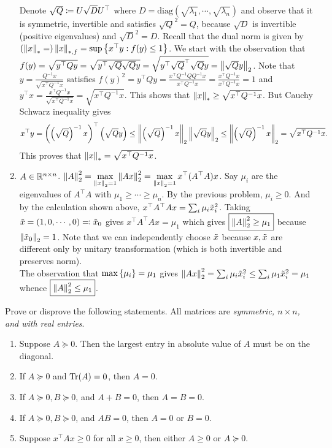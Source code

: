 \begin{enumerate}[leftmargin=*]
Denote $\sqrt{Q}\coloneqq U \sqrt D U^\top$ where $D=\text{diag}(\sqrt{\lambda_1},\cdots,\sqrt{\lambda_n})$ and observe that it is symmetric, invertible and satisfies $\sqrt Q^2 = Q$, because $\sqrt{D}$ is invertible (positive eigenvalues) and $\sqrt D^2=D$.
Recall that the dual norm is given by $\left(\left\lVert x \right\rVert_{*}=\right)\left\lVert x \right\rVert_{*,f} = \sup\left\{x^\top y : f(y)\leq 1\right\}$. We start with the observation that $f(y) = \sqrt{y^\top Q y} = \sqrt{y^\top \sqrt Q \sqrt Q y} = \sqrt{y^\top \sqrt Q^\top \sqrt Q y} = \left\lVert \sqrt Qy \right\rVert_{2}$. 
Note that $y=\frac{Q^{-1}x}{\sqrt{x^\top Q^{-1}x}}$ satisfies $f(y)^2 = y^\top Q y = \frac{x^\top Q^{-1} Q Q^{-1}x}{x^\top Q^{-1}x} = \frac{x^\top Q^{-1}x}{x^\top Q^{-1}x} = 1$ and $y^\top x= \frac{x^\top Q^{-1}x}{\sqrt{x^\top Q^{-1}x}} = \sqrt{x^\top Q^{-1}x}$. This shows that $\left\lVert x \right\rVert_{*} \geq \sqrt{x^\top Q^{-1}x}$. But Cauchy Schwarz inequality gives 
$$x^\top y = \left(\left(\sqrt Q\right)^{-1} x\right)^\top\left(\sqrt Qy\right)\leq \left\lVert \left(\sqrt Q\right)^{-1}x \right\rVert_{2}\left\lVert \sqrt Qy \right\rVert_{2} \leq \left\lVert \left(\sqrt Q\right)^{-1}x \right\rVert_{2}=\sqrt{x^\top Q^{-1}x}.$$ This proves that $\left\lVert x \right\rVert_{*} = \sqrt{x^\top Q^{-1}x}$.

\item $A\in\mathbb{R}^{n\times n}$. $\displaystyle\left\lVert A \right\rVert_{2} ^2 = \max_{\left\lVert x \right\rVert_{2} = 1}\left\lVert Ax \right\rVert_{2}^2 = \max_{\left\lVert x \right\rVert_{2} = 1} x^\top (A^\top A)x$. Say $\mu_i$ are the eigenvalues of $A^\top A$ with $\mu_1\geq\cdots\geq \mu_n$. By the previous problem, $\mu_i\geq 0$. And by the calculation shown above, $x^\top A^\top Ax = \sum_i\mu_i{\tilde{x}}_i^2$. Taking ${\tilde{x}} = (1,0,\cdots,0) \eqqcolon {\tilde{x}}_0$ gives $x^\top A^\top Ax = \mu_1$ which gives $\boxed{\left\lVert A \right\rVert_{2} ^2 \ge \mu_1}$ because $\left\lVert {\tilde{x}}_0 \right\rVert_{2}=1$. Note that we can independently choose ${\tilde{x}}$ because $x,{\tilde{x}}$ are different only by unitary transformation (which is both invertible and preserves norm).
\\
The observation that $\max\left\{\mu_i\right\}=\mu_1$ gives $\left\lVert Ax \right\rVert_{2}^2 = \sum_i\mu_i{\tilde{x}}_i^2 \leq \sum_i \mu_1 {\tilde{x}}_i^2 = \mu_1$ whence $\boxed{\left\lVert A \right\rVert_{2} ^2 \leq \mu_1}$.
\end{enumerate}













\newpage
\pb
Prove or disprove the following statements. All matrices are \textit{symmetric, $n \times n$, and with real entries}.
\begin{enumerate}[leftmargin=*]
\item Suppose $A \succeq 0$. Then the largest entry in absolute value of $A$ must be on the diagonal.
\item If $A \succeq 0$ and $\operatorname{Tr}(A) = 0$, then $A = 0$.
\item If $A \succeq 0, B \succeq 0$, and $A + B = 0$, then $A = B = 0$.
\item If $A \succeq 0, B \succeq 0$, and $AB = 0$, then $A = 0$ or $B = 0$.
\item Suppose $x^\top Ax\ge0$ for all $x\ge0$, then either $A\ge0$ or $A\succeq0$. \end{enumerate}
\soln 

